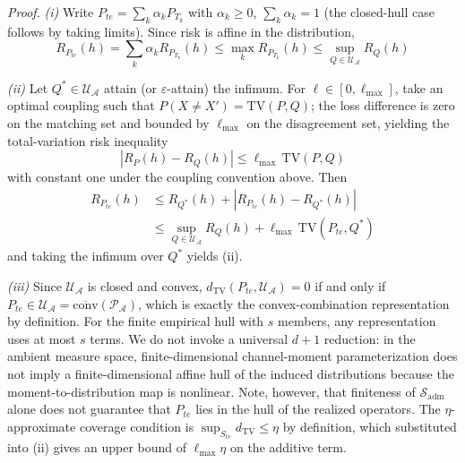\documentclass[electronics,article,submit,moreauthors]{Definitions/mdpi}
\newcommand{\add}[1]{\textcolor{addblue}{#1}}
\newcommand{\del}[1]{\textcolor{delred}{\st{#1}}}
\def\add#1{#1}%
\def\del#1{}%
\renewcommand{\add}[1]{#1}
\renewcommand{\del}[1]{}
\begin{document}
\noindent\textit{Proof.}
\emph{(i)} Write $P_{te}=\sum_k\alpha_k P_{T_k}$ with $\alpha_k\geq0$, $\sum_k\alpha_k=1$ (the closed-hull case follows by taking limits). Since risk is affine in the distribution,
\begin{equation}
R_{P_{te}}(h)=\sum_k\alpha_k R_{P_{T_k}}(h)\leq\max_k R_{P_{T_k}}(h)\leq\sup_{Q\in\mathcal{U}_{\mathcal{A}}}R_Q(h)
\end{equation}

\emph{(ii)} Let $Q^*\in\mathcal{U}_{\mathcal{A}}$ attain (or $\varepsilon$-attain) the infimum. For $\ell\in[0,\ell_{\max}]$, take an optimal coupling such that $P(X\neq X')=\mathrm{TV}(P,Q)$; the loss difference is zero on the matching set and bounded by $\ell_{\max}$ on the disagreement set, yielding the total-variation risk inequality
\begin{equation}
|R_P(h)-R_Q(h)|\leq\ell_{\max}\,\mathrm{TV}(P,Q)
\end{equation}
with constant one under the coupling convention above. Then
\begin{equation*}
\begin{aligned}
R_{P_{te}}(h)&\leq R_{Q^*}(h)+|R_{P_{te}}(h)-R_{Q^*}(h)|\\
&\leq\sup_{Q\in\mathcal{U}_{\mathcal{A}}}R_Q(h)+\ell_{\max}\,\mathrm{TV}(P_{te},Q^*)
\end{aligned}
\end{equation*}
and taking the infimum over $Q^*$ yields (ii).

\emph{(iii)} Since $\mathcal{U}_{\mathcal{A}}$ is closed and convex, $d_{\mathrm{TV}}(P_{te},\mathcal{U}_{\mathcal{A}})=0$ if and only if $P_{te}\in\mathcal{U}_{\mathcal{A}}=\overline{\mathrm{conv}}(\mathcal{P}_{\mathcal{A}})$, which is exactly the convex-combination representation\add{ by definition}. \del{Carath\'eodory's theorem in the affine hull of \mbox{$\mathcal{P}_{\mathcal{A}}$} (dimension at most \mbox{$d$}) reduces any such combination to at most \mbox{$d+1$} members, all belonging to \mbox{$\mathcal{P}_{\mathcal{A}}$} whether the shift space \mbox{$\mathcal{S}_{\mathrm{adm}}$} is discrete or continuous.}\add{For the finite empirical hull with $s$ members, any representation uses at most $s$ terms. We do not invoke a universal $d+1$ reduction: in the ambient measure space, finite-dimensional channel-moment parameterization does not imply a finite-dimensional affine hull of the induced distributions because the moment-to-distribution map is nonlinear.} Note, however, that finiteness of $\mathcal{S}_{\mathrm{adm}}$ alone does not guarantee that $P_{te}$ lies in the hull of the realized operators. The $\eta$-approximate coverage condition is $\sup_{S_{te}}d_{\mathrm{TV}}\leq\eta$ by definition, which substituted into (ii) gives an upper bound of $\ell_{\max}\eta$ on the additive term.
\end{document}
